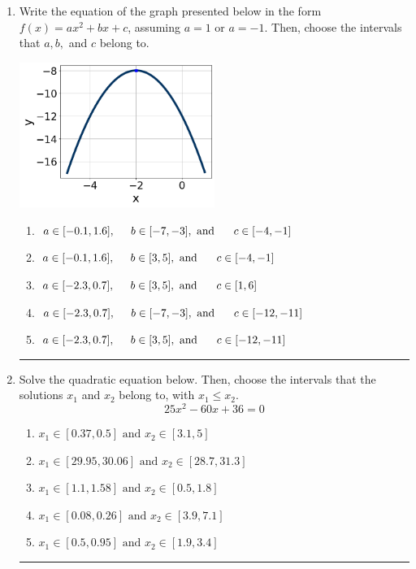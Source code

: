\documentclass[14pt]{extbook}
\newcommand{\litem}[1]{\item#1\hspace*{-1cm}\rule{\textwidth}{0.4pt}}
\begin{document}
\begin{enumerate}
{\begin{enumerate}[label=\Alph*.]
\end{enumerate} }
\litem{
Write the equation of the graph presented below in the form $f(x)=ax^2+bx+c$, assuming  $a=1$ or $a=-1$. Then, choose the intervals that $a, b,$ and $c$ belong to.
\begin{center}
    \includegraphics[width=0.5\textwidth]{../Figures/quadraticGraphToEquationB.png}
\end{center}
\begin{enumerate}[label=\Alph*.]
\item \( a \in [-0.1, 1.6], \hspace*{5mm} b \in [-7, -3], \text{ and } \hspace*{5mm} c \in [-4, -1] \)
\item \( a \in [-0.1, 1.6], \hspace*{5mm} b \in [3, 5], \text{ and } \hspace*{5mm} c \in [-4, -1] \)
\item \( a \in [-2.3, 0.7], \hspace*{5mm} b \in [3, 5], \text{ and } \hspace*{5mm} c \in [1, 6] \)
\item \( a \in [-2.3, 0.7], \hspace*{5mm} b \in [-7, -3], \text{ and } \hspace*{5mm} c \in [-12, -11] \)
\item \( a \in [-2.3, 0.7], \hspace*{5mm} b \in [3, 5], \text{ and } \hspace*{5mm} c \in [-12, -11] \)

\end{enumerate} }
\litem{
Solve the quadratic equation below. Then, choose the intervals that the solutions $x_1$ and $x_2$ belong to, with $x_1 \leq x_2$.\[ 25x^{2} -60 x + 36 = 0 \]\begin{enumerate}[label=\Alph*.]
\item \( x_1 \in [0.37, 0.5] \text{ and } x_2 \in [3.1, 5] \)
\item \( x_1 \in [29.95, 30.06] \text{ and } x_2 \in [28.7, 31.3] \)
\item \( x_1 \in [1.1, 1.58] \text{ and } x_2 \in [0.5, 1.8] \)
\item \( x_1 \in [0.08, 0.26] \text{ and } x_2 \in [3.9, 7.1] \)
\item \( x_1 \in [0.5, 0.95] \text{ and } x_2 \in [1.9, 3.4] \)


\end{enumerate}}
\end{enumerate}
\end{document}
